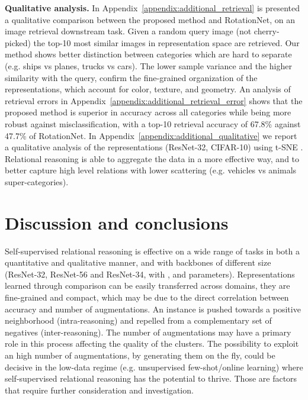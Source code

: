 \documentclass{article}
\begin{document}
\textbf{Qualitative analysis.} In Appendix~\ref{appendix:additional_retrieval} is presented a qualitative comparison between the proposed method and RotationNet, on an image retrieval downstream task. Given a random query image (not cherry-picked) the top-10 most similar images in representation space are retrieved. Our method shows better distinction between categories which are hard to separate (e.g. ships vs planes, trucks vs cars). The lower sample variance and the higher similarity with the query, confirm the fine-grained organization of the representations, which account for color, texture, and geometry. An analysis of retrieval errors in Appendix~\ref{appendix:additional_retrieval_error} shows that the proposed method is superior in accuracy across all categories while being more robust against misclassification, with a top-10 retrieval accuracy of 67.8\% against 47.7\% of RotationNet. In Appendix~\ref{appendix:additional_qualitative} we report a qualitative analysis of the representations (ResNet-32, CIFAR-10) using t-SNE \citep{maaten2008visualizing}. Relational reasoning is able to aggregate the data in a more effective way, and to better capture high level relations with lower scattering (e.g. vehicles vs animals super-categories).


\section{Discussion and conclusions}\label{sec:discussion}

Self-supervised relational reasoning is effective on a wide range of tasks in both a quantitative and qualitative manner, and with backbones of different size (ResNet-32, ResNet-56 and ResNet-34, with ,  and  parameters). 
Representations learned through comparison can be easily transferred across domains, they are fine-grained and compact, which may be due to the direct correlation between accuracy and number of augmentations. An instance is pushed towards a positive neighborhood (intra-reasoning) and repelled from a complementary set of negatives (inter-reasoning). The number of augmentations may have a primary role in this process affecting the quality of the clusters.
The possibility to exploit an high number of augmentations, by generating them on the fly, could be decisive in the low-data regime (e.g. unsupervised few-shot/online learning) where self-supervised relational reasoning has the potential to thrive. Those are factors that require further consideration and investigation.
\end{document}
